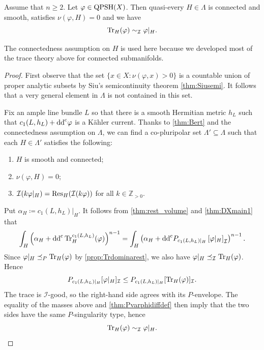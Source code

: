 \begin{corollary}\label{cor:ABTfortrace}
    Assume that $n\geq 2$.
    Let $\varphi\in \mathrm{QPSH}(X)$. Then quasi-every $H\in \Lambda$ is connected and smooth, satisfies $\nu(\varphi,H)=0$ and we have
    \[
    \operatorname{Tr}_H(\varphi)\sim_{\mathcal{I}} \varphi|_H.
    \]
\end{corollary}
The connectedness assumption on $H$ is used here because we developed most of the trace theory above for connected submanifolds.
\begin{proof}
    First observe that the set $\{x\in X:\nu(\varphi,x)>0\}$ is a countable union of proper analytic subsets by Siu's semicontinuity theorem \cref{thm:Siusemi}. It follows that a very general element in $\Lambda$ is not contained in this set.

    Fix an ample line bundle $L$ so that there is a smooth Hermitian metric $h_L$ such that $c_1(L,h_L)+\mathrm{dd}^{\mathrm{c}} \varphi$ is a Kähler current. Thanks to \cref{thm:Bert} and the connectedness assumption on $\Lambda$, we can find a co-pluripolar set $\Lambda'\subseteq \Lambda$ such that each $H\in \Lambda'$ satisfies the following:
    \begin{enumerate}
        \item\label{itm:chapter-trace:L946:1} $H$ is smooth and connected;
        \item\label{itm:chapter-trace:L946:2} $\nu(\varphi,H)=0$;
        \item\label{itm:chapter-trace:L946:3} $\mathcal{I}(k\varphi|_H)=\operatorname{Res}_{H}(\mathcal{I}(k\varphi))$ for all $k\in \mathbb{Z}_{>0}$.
    \end{enumerate}
    Put $\alpha_H\coloneqq c_1(L,h_L)|_H$. It follows from \cref{thm:rest_volume} and \cref{thm:DXmain1} that
    \[
    \int_H \left( \alpha_H+\mathrm{dd}^{\mathrm{c}} \operatorname{Tr}_H^{c_1(L,h_L)}(\varphi)\right)^{n-1}
    =
    \int_H \left( \alpha_H+\mathrm{dd}^{\mathrm{c}} P_{c_1(L,h_L)|_H}\left[\varphi|_H\right]_{\mathcal{I}}  \right)^{n-1}.
    \]
    Since $\varphi|_H\preceq_P \operatorname{Tr}_H(\varphi)$ by \cref{prop:Trdominarest}, we also have $\varphi|_H\preceq_{\mathcal I}\operatorname{Tr}_H(\varphi)$. Hence
    \[
        P_{c_1(L,h_L)|_H}[\varphi|_H]_{\mathcal I}\leq P_{c_1(L,h_L)|_H}[\operatorname{Tr}_H(\varphi)]_{\mathcal I}.
    \]
    The trace is $\mathcal I$-good, so the right-hand side agrees with its $P$-envelope. The equality of the masses above and \cref{thm:Pvarphidiffdef} then imply that the two sides have the same $P$-singularity type, hence
    \[
        \operatorname{Tr}_H(\varphi)\sim_{\mathcal I}\varphi|_H.
    \]
\end{proof}





